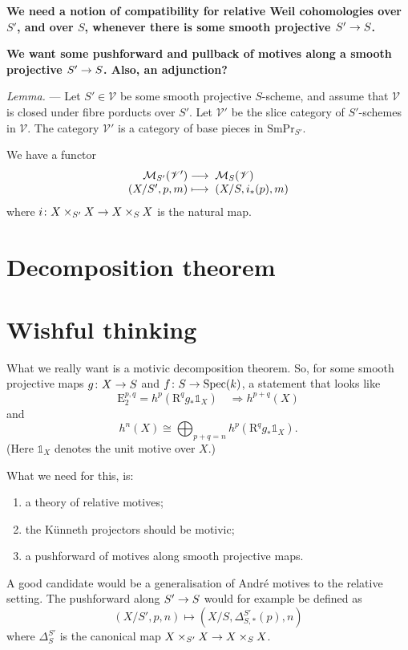 \documentclass[a4paper,10pt]{article}
\def\fixme{\textbf}
\newenvironment{lemma}{\medskip\textit{Lemma.} --- }{}
\def\basepieces{\mathscr{V}}
\def\smpr{\mathrm{SmPr}}
\begin{document}
\fixme{We need a notion of compatibility for relative Weil cohomologies over
	$S'$, and over $S$, whenever there is some smooth projective
$\map{S'}{S}$.}

\fixme{We want some pushforward and pullback of motives along a smooth
projective $\map{S'}{S}$. Also, an adjunction?}

\begin{lemma} %
	Let $S' \in \basepieces$ be some smooth projective $S$-scheme, and
	assume that $\basepieces$ is closed under fibre porducts over $S'$. Let
	$\basepieces'$ be the slice category of $S'$-schemes in $\basepieces$.
	The category $\basepieces'$ is a category of base pieces in
	$\smpr_{S'}$.

	We have a functor
	\[
		\map{\mathcal{M}_{S'}(\basepieces')}%
		{\mathcal{M}_{S}(\basepieces)}%
		[(X/S', p, m)][(X/S, i_{*}(p), m)]
	\]
	where $\map[i]{X \times_{S'} X}{X \times_{S} X}$ is the natural map.
\end{lemma} %


\section{Decomposition theorem}

\section{Wishful thinking}

What we really want is a motivic decomposition theorem. So, for some smooth
projective maps $\map[g]{X}{S}$ and $\map[f]{S}{\mathrm{Spec}(k)}$, a statement
that looks like
\[
	\mathrm{E}_{2}^{p,q} = h^{p}(\mathrm{R}^{q}g_{*} \mathbb{1}_{X})
	\quad \Longrightarrow h^{p+q}(X)
\]
and
\[
	h^{n}(X) \cong \bigoplus_{p+q = n} h^{p}(\mathrm{R}^{q}g_{*}
	\mathbb{1}_{X}).
\]
(Here $\mathbb{1}_{X}$ denotes the unit motive over $X$.)

What we need for this, is:
\begin{enumerate} %
	\item a theory of relative motives;
	\item the K\"{u}nneth projectors should be motivic;
	\item a pushforward of motives along smooth projective maps.
\end{enumerate} %
A good candidate would be a generalisation of Andr\'{e} motives to the relative
setting. The pushforward along $\map{S'}{S}$ would for example be defined as
\[
	(X/S', p, n) \mapsto (X/S, \Delta^{S'}_{S,*}(p), n)
\]
where $\Delta^{S'}_{S}$ is the canonical map $\map{X \times_{S'} X}{X
\times_{S} X}$.
\end{document}
